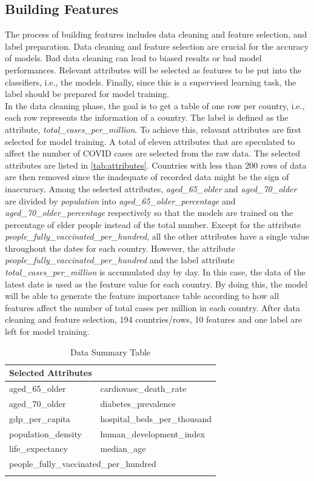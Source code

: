 \documentclass[10pt, a4paper, twocolumn]{article} %
\begin{document}
\subsection{Building Features}
The process of building features includes data cleaning and feature selection, and label preparation. Data cleaning 
and feature selection are crucial for the accuracy of models. Bad data cleaning can lead to biased results or 
bad model performances. Relevant attributes will be selected as features to be put into the classifiers, i.e., 
the models. Finally, since this is a supervised learning task, the label should be prepared for model training.\\[10pt]
In the data cleaning phase, the goal is to get a table of one row per country, i.e., each row represents the 
information of a country. The label is defined as the attribute, \emph{total\_cases\_per\_million}. To achieve this, 
relavant attributes are first selected for model training. A total of eleven attributes that are speculated to 
affect the number of COVID cases are selected from the raw data. The selected attributes are listed in 
\autoref{tab:attributes}. Countries with less than 200 rows of data are then removed since the inadequate of recorded data 
might be the sign of inaccuracy. Among the 
selected attributes, \emph{aged\_65\_older} and \emph{aged\_70\_older} are divided by \emph{population} into 
\emph{aged\_65\_older\_percentage} and \emph{aged\_70\_older\_percentage} respectively so that the models are 
trained on the percentage of elder people instead of the total number. Except for the attribute 
\emph{people\_fully\_vaccinated\_per\_hundred}, all the other attributes have a single value throughout the dates 
for each country. However, the attribute \emph{people\_fully\_vaccinated\_per\_hundred} and the label attribute 
\emph{total\_cases\_per\_million} is accumulated day by day. In this case, the data of the latest date is used as 
the feature value for each country. By doing this, the model will be able to generate the feature importance 
table according to how all features affect the number of total cases per million in each country. After data 
cleaning and feature selection, 194 countries/rows, 10 features and one label are left for model training.\\[10pt]
\begin{table}
	\caption{Data Summary Table}
	\centering
	\begin{tabular}{ll}
		\toprule
		\textbf{Selected Attributes} &  \\
		\midrule
		aged\_65\_older & cardiovasc\_death\_rate \\
		aged\_70\_older & diabetes\_prevalence \\
		gdp\_per\_capita & hospital\_beds\_per\_thousand \\
		population\_density & human\_development\_index \\
		life\_expectancy & median\_age \\
		\multicolumn{2}{l}{people\_fully\_vaccinated\_per\_hundred} \\
		\bottomrule
	\label{tab:attributes}
	\end{tabular}
\end{table}
\end{document}
